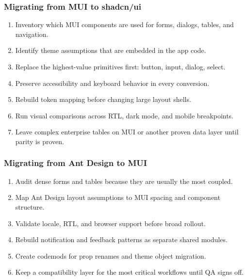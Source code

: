\subsubsection*{Migrating from MUI to shadcn/ui}
\begin{enumerate}[leftmargin=*, itemsep=0.35em]
  \item Inventory which MUI components are used for forms, dialogs, tables, and navigation.
  \item Identify theme assumptions that are embedded in the app code.
  \item Replace the highest-value primitives first: button, input, dialog, select.
  \item Preserve accessibility and keyboard behavior in every conversion.
  \item Rebuild token mapping before changing large layout shells.
  \item Run visual comparisons across RTL, dark mode, and mobile breakpoints.
  \item Leave complex enterprise tables on MUI or another proven data layer until parity is proven.
\end{enumerate}

\subsubsection*{Migrating from Ant Design to MUI}
\begin{enumerate}[leftmargin=*, itemsep=0.35em]
  \item Audit dense forms and tables because they are usually the most coupled.
  \item Map Ant Design layout assumptions to MUI spacing and component structure.
  \item Validate locale, RTL, and browser support before broad rollout.
  \item Rebuild notification and feedback patterns as separate shared modules.
  \item Create codemods for prop renames and theme object migration.
  \item Keep a compatibility layer for the most critical workflows until QA signs off.
\end{enumerate}

